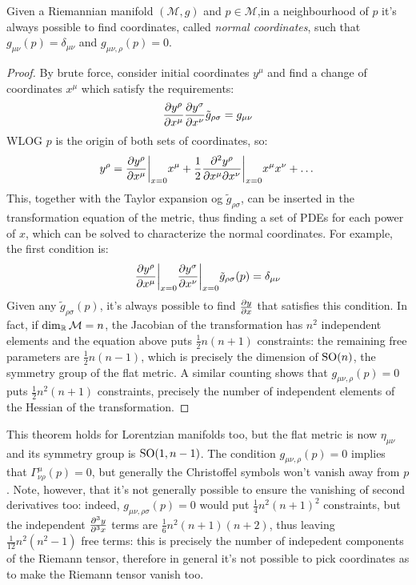 \begin{theorem}
  Given a Riemannian manifold $ (\mathcal{M},g) $ and $ p \in \mathcal{M} $,in a neighbourhood of $ p $ it's always possible to find coordinates, called \textit{normal coordinates}, such that $ g_{\mu \nu}(p) = \delta_{\mu \nu} $ and $ g_{\mu \nu , \rho}(p) = 0 $.
\end{theorem}
\begin{proof}
  By brute force, consider initial coordinates $ y^\mu $ and find a change of coordinates $ x^\mu $ which satisfy the requirements:
  \begin{equation*}
    \frac{\partial y^\rho}{\partial x^\mu} \frac{\partial y^\sigma}{\partial x^\nu} \tilde{g}_{\rho \sigma} = g_{\mu \nu}
  \end{equation*}
  WLOG $ p $ is the origin of both sets of coordinates, so:
  \begin{equation*}
    y^\rho = \frac{\partial y^\rho}{\partial x^\mu}\bigg\vert_{x = 0} x^\mu + \frac{1}{2} \frac{\partial^2 y^\rho}{\partial x^\mu \partial x^\nu}\bigg\vert_{x = 0} x^\mu x^\nu + \dots
  \end{equation*}
  This, together with the Taylor expansion og $ \tilde{g}_{\rho \sigma} $, can be inserted in the transformation equation of the metric, thus finding a set of PDEs for each power of $ x $, which can be solved to characterize the normal coordinates. For example, the first condition is:
  \begin{equation*}
    \frac{\partial y^\rho}{\partial x^\mu}\bigg\vert_{x = 0} \frac{\partial y^\sigma}{\partial x^\nu}\bigg\vert_{x = 0} \tilde{g}_{\rho \sigma}(p) = \delta_{\mu \nu}
  \end{equation*}
  Given any $ \tilde{g}_{\rho \sigma}(p) $, it's always possible to find $ \frac{\partial y}{\partial x} $ that satisfies this condition. In fact, if $ \dim_{\mathbb{R}} \mathcal{M} = n $, the Jacobian of the transformation has $ n^2 $ independent elements and the equation above puts $ \frac{1}{2} n (n + 1) $ constraints: the remaining free parameters are $ \frac{1}{2} n (n - 1) $, which is precisely the dimension of $ \mathrm{SO}(n) $, the symmetry group of the flat metric.
  A similar counting shows that $ g_{\mu \nu , \rho}(p) = 0 $ puts $ \frac{1}{2} n^2 (n + 1) $ constraints, precisely the number of independent elements of the Hessian of the transformation.
\end{proof}

This theorem holds for Lorentzian manifolds too, but the flat metric is now $ \eta_{\mu \nu} $ and its symmetry group is $ \mathrm{SO}(1, n-1) $. The condition $ g_{\mu \nu , \rho}(p) = 0 $ implies that $ \Gamma^\mu_{\nu \rho}(p) = 0 $, but generally the Christoffel symbols won't vanish away from $ p $. Note, however, that it's not generally possible to ensure the vanishing of second derivatives too: indeed, $ g_{\mu \nu , \rho \sigma}(p) = 0 $ would put $ \frac{1}{4} n^2 (n + 1)^2 $ constraints, but the independent $ \frac{\partial^3 y}{\partial^3 x} $ terms are $ \frac{1}{6} n^2 (n+1) (n+2) $, thus leaving $ \frac{1}{12} n^2 (n^2 - 1) $ free terms: this is precisely the number of indepedent components of the Riemann tensor, therefore in general it's not possible to pick coordinates as to make the Riemann tensor vanish too.

